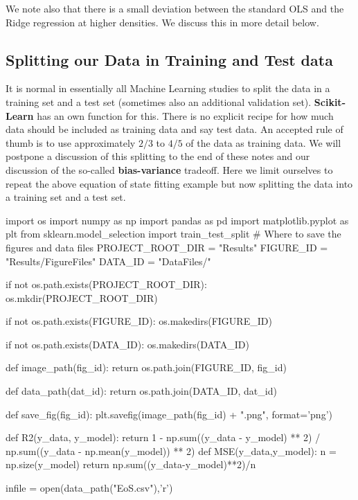 \documentclass[%
oneside,                 %
final,                   %
10pt]{article}
\begin{document}
We note also that there is a small deviation between the
standard OLS and the Ridge regression at higher densities. We discuss this in more detail
below.


\subsection{Splitting our Data in Training and Test data}

It is normal in essentially all Machine Learning studies to split the
data in a training set and a test set (sometimes also an additional
validation set).  \textbf{Scikit-Learn} has an own function for this. There
is no explicit recipe for how much data should be included as training
data and say test data.  An accepted rule of thumb is to use
approximately $2/3$ to $4/5$ of the data as training data. We will
postpone a discussion of this splitting to the end of these notes and
our discussion of the so-called \textbf{bias-variance} tradeoff. Here we
limit ourselves to repeat the above equation of state fitting example
but now splitting the data into a training set and a test set.

\bpycod
import os
import numpy as np
import pandas as pd
import matplotlib.pyplot as plt
from sklearn.model_selection import train_test_split
# Where to save the figures and data files
PROJECT_ROOT_DIR = "Results"
FIGURE_ID = "Results/FigureFiles"
DATA_ID = "DataFiles/"

if not os.path.exists(PROJECT_ROOT_DIR):
    os.mkdir(PROJECT_ROOT_DIR)

if not os.path.exists(FIGURE_ID):
    os.makedirs(FIGURE_ID)

if not os.path.exists(DATA_ID):
    os.makedirs(DATA_ID)

def image_path(fig_id):
    return os.path.join(FIGURE_ID, fig_id)

def data_path(dat_id):
    return os.path.join(DATA_ID, dat_id)

def save_fig(fig_id):
    plt.savefig(image_path(fig_id) + ".png", format='png')

def R2(y_data, y_model):
    return 1 - np.sum((y_data - y_model) ** 2) / np.sum((y_data - np.mean(y_model)) ** 2)
def MSE(y_data,y_model):
    n = np.size(y_model)
    return np.sum((y_data-y_model)**2)/n

infile = open(data_path("EoS.csv"),'r')
\end{document}

